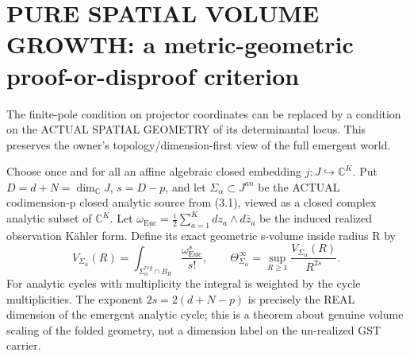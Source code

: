 \documentclass[11pt]{article}
\begin{document}
\section{PURE SPATIAL VOLUME GROWTH: a metric-geometric proof-or-disproof criterion}

The finite-pole condition on projector coordinates
can be replaced by a condition on the
ACTUAL SPATIAL GEOMETRY of its determinantal locus.
This preserves the owner's topology/dimension-first
view of the full emergent world.

Choose once and for all an affine algebraic
closed embedding $j:J\hookrightarrow\mathbb C^K$.
Put $D=d+N=\dim_{\mathbb C}J$,
$s=D-p$, and let $\Sigma_\alpha\subset J^{an}$
be the ACTUAL codimension-p closed analytic
source from (3.1), viewed as a closed complex
analytic subset of $\mathbb C^K$.
Let $\omega_{\mathrm{Euc}}=\frac{i}{2}
 \sum_{a=1}^K dz_a\wedge d\bar z_a$
be the induced realized observation K\"ahler form.
Define its exact geometric s-volume inside radius R by
\[
 \boxed{
 V_{\Sigma_\alpha}(R)=
  \int_{\Sigma_\alpha^{reg}\cap B_R}
   \frac{\omega_{\mathrm{Euc}}^s}{s!},
 \qquad
 \Theta_{\Sigma_\alpha}^{\infty}
  =\sup_{R\ge1}\frac{V_{\Sigma_\alpha}(R)}{R^{2s}}.
 }                                                        \tag{5.1}
\]
For analytic cycles with multiplicity the integral
is weighted by the cycle multiplicities.
The exponent $2s=2(d+N-p)$ is precisely the
REAL dimension of the emergent analytic cycle;
this is a theorem about genuine volume scaling
of the folded geometry, not a dimension label
on the un-realized GST carrier.
\end{document}
